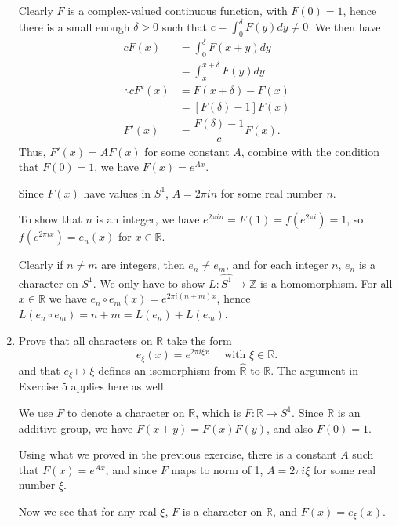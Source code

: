 \documentclass{article}
\begin{document}
\begin{enumerate}
\begin{solution}
        Clearly $F$ is a complex-valued continuous function, with $F(0)=1$, hence there is a small enough $\delta>0$ such that
        $c=\int_0^\delta F(y)dy\neq 0$. We then have
        \begin{align*}
            cF(x) &= \int_0^\delta F(x+y)dy\\
            &= \int_x^{x+\delta} F(y)dy\\
            \therefore cF'(x) &= F(x+\delta) - F(x)\\
            &= [F(\delta)-1]F(x)\\
            F'(x) &= \dfrac{F(\delta)-1}{c}F(x).
        \end{align*} 
        Thus, $F'(x) = AF(x)$ for some constant $A$, combine with the condition that $F(0)=1$, we have $F(x) = e^{Ax}$.

        Since $F(x)$ have values in $S^1$, $A=2\pi in$ for some real number $n$.

        To show that $n$ is an integer, we have $e^{2\pi in} = F(1)=f(e^{2\pi i}) = 1$, so $f(e^{2\pi ix})=e_n(x)$ for $x\in\mathbb R$.

        Clearly if $n\neq m$ are integers, then $e_n\neq e_m$, and for each integer $n$, $e_n$ is a character on $S^1$. We only have to show
        $L: \widehat{S^1} \to \mathbb Z$ is a homomorphism. For all $x\in\mathbb R$ we have $e_n\circ e_m(x) = e^{2\pi i(n+m)x}$,
        hence $L(e_n\circ e_m) = n+m = L(e_n) + L(e_m)$.
    \end{solution}

    \item Prove that all characters on $\mathbb R$ take the form
    $$e_\xi(x) = e^{2\pi i\xi x}\quad \text{ with }\xi\in\mathbb R.$$
    and that $e_\xi\mapsto \xi$ defines an isomorphism from $\widehat{\mathbb R}$ to $\mathbb R$. The argument in Exercise 5
    applies here as well.

    \begin{solution}
        We use $F$ to denote a character on $\mathbb R$, which is $F: \mathbb R\to S^1$. Since $\mathbb R$ is an additive group,
        we have $F(x+y) = F(x)F(y)$, and also $F(0)=1$.

        Using what we proved in the previous exercise, there is a constant $A$ such that $F(x) = e^{Ax}$, and since $F$ maps to norm of 1,
        $A=2\pi i\xi$ for some real number $\xi$.

        Now we see that for any real $\xi$, $F$ is a character on $\mathbb R$, and $F(x) = e_\xi(x)$.


\end{solution}
\end{enumerate}
\end{document}
